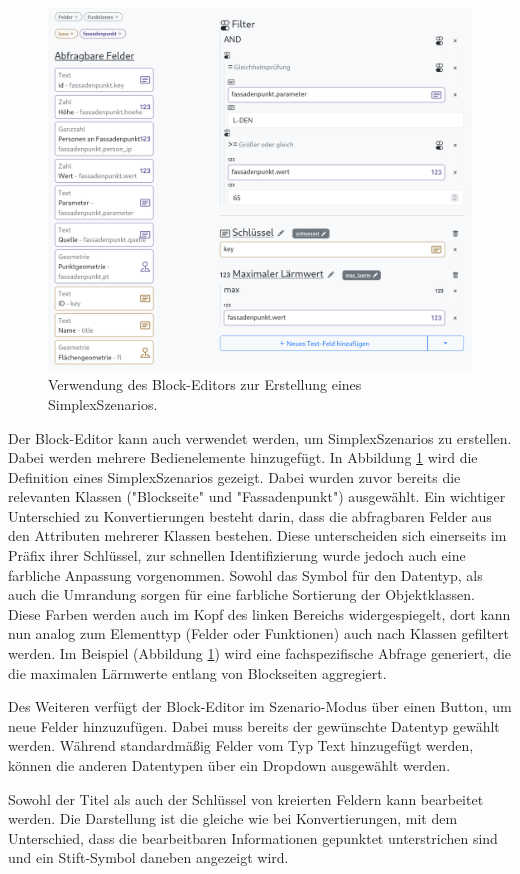 \begin{figure}[ht]
  \begin{center}
    \includegraphics[width=.95\textwidth]{assets/lpz-scenario.png}
  \end{center}
  \caption{Verwendung des Block-Editors zur Erstellung eines SimplexSzenarios.}
  \label{fig:buffet-scenario}
\end{figure}

Der Block-Editor kann auch verwendet werden, um SimplexSzenarios zu erstellen. Dabei werden mehrere Bedienelemente hinzugefügt. In Abbildung \ref{fig:buffet-scenario} wird die Definition eines SimplexSzenarios gezeigt. Dabei wurden zuvor bereits die relevanten Klassen ("Blockseite" und "Fassadenpunkt") ausgewählt. Ein wichtiger Unterschied zu Konvertierungen besteht darin, dass die abfragbaren Felder aus den Attributen mehrerer Klassen bestehen. Diese unterscheiden sich einerseits im Präfix ihrer Schlüssel, zur schnellen Identifizierung wurde jedoch auch eine farbliche Anpassung vorgenommen. Sowohl das Symbol für den Datentyp, als auch die Umrandung sorgen für eine farbliche Sortierung der Objektklassen. Diese Farben werden auch im Kopf des linken Bereichs widergespiegelt, dort kann nun analog zum Elementtyp (Felder oder Funktionen) auch nach Klassen gefiltert werden. Im Beispiel (Abbildung \ref{fig:buffet-scenario}) wird eine fachspezifische Abfrage generiert, die die maximalen Lärmwerte entlang von Blockseiten aggregiert.

Des Weiteren verfügt der Block-Editor im Szenario-Modus über einen Button, um neue Felder hinzuzufügen. Dabei muss bereits der gewünschte Datentyp gewählt werden. Während standardmäßig Felder vom Typ Text hinzugefügt werden, können die anderen Datentypen über ein Dropdown ausgewählt werden.

Sowohl der Titel als auch der Schlüssel von kreierten Feldern kann bearbeitet werden. Die Darstellung ist die gleiche wie bei Konvertierungen, mit dem Unterschied, dass die bearbeitbaren Informationen gepunktet unterstrichen sind und ein Stift-Symbol daneben angezeigt wird.
